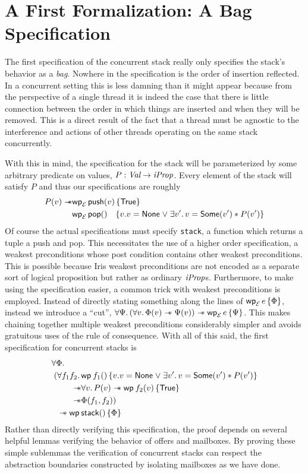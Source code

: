 \section{A First Formalization: A Bag Specification}

The first specification of the concurrent stack really only
specifies the stack's behavior as a \emph{bag}. Nowhere in the
specification is the order of insertion reflected. In a concurrent
setting this is less damning than it might appear because from the
perspective of a single thread it is indeed the case that there is
little connection between the order in which things are inserted and
when they will be removed. This is a direct result of the fact that a
thread must be agnostic to the interference and actions of other
threads operating on the same stack concurrently.

With this in mind, the specification for the stack will be
parameterized by some arbitrary predicate on values,
$P : \textit{Val} \to \textit{iProp}$. Every element of the stack will satisfy $P$ and
thus our specifications are roughly
\begin{align*}
  P(v) \wand &\wpre{\textlog{push}(v)}[\mathcal{E}]{\TRUE}\\
  &\wpre{\textlog{pop}()\ \ \,}[\mathcal{E}]
  {v. v = \textlog{None} \mathrel{\vee} \Exists v'. v = \textlog{Some}(v') * P(v')}
\end{align*}
Of course the actual specifications must specify {\tt stack}, a
function which returns a tuple a push and pop. This necessitates the
use of a higher order specification, a weakest preconditions whose
post condition contains other weakest preconditions. This is possible
because Iris weakest preconditions are not encoded as a separate sort
of logical proposition but rather as ordinary $\textit{iProp}$s. Furthermore,
to make using the specification easier, a common trick with weakest
preconditions is employed. Instead of directly stating something along
the lines of $\wpre{e}[\mathcal{E}]{\Phi}$, instead we introduce a
``cut'',
$\All \Psi. (\All v. \Phi(v) \wand \Psi(v)) \wand \wpre{e}[\mathcal{E}]{\Psi}$. This
makes chaining together multiple weakest preconditions considerably
simpler and avoids gratuitous uses of the rule of consequence. With
all of this said, the first specification for concurrent stacks is
\begin{align*}
  \forall \Phi.\qquad&\\
  (\All f_1 f_2.&
        \wpre{f_1()}{v. v = \textlog{None} \mathrel{\vee} \Exists v'. v = \textlog{Some}(v') * P(v')}\\
  \wand & \All v. P(v) \wand \wpre{f_2(v)}{\TRUE}\\
  \wand & \Phi(f_1, f_2))\\
  \wand \wpre{&\textlog{stack}()}{\Phi}
\end{align*}
Rather than directly verifying this specification, the proof depends
on several helpful lemmas verifying the behavior of offers and
mailboxes. By proving these simple sublemmas the verification of
concurrent stacks can respect the abstraction boundaries constructed by
isolating mailboxes as we have done.

